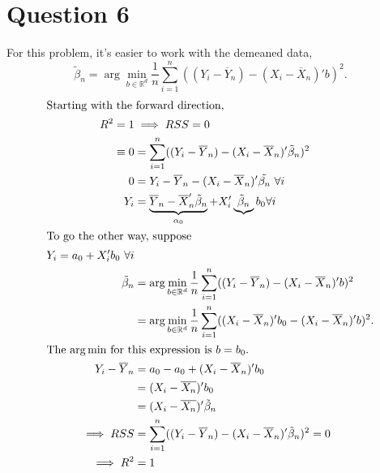 \documentclass[11pt]{article}
\newcommand{\R}{\mathbb{R}}
\begin{document}
\newpage
\section{Question 6}
\label{sec:org30a0a10}
For this problem, it's easier to work with the demeaned data, 
\[
  \tilde{\beta}_n = \arg \min_{b \in \R^d} \frac{1}{n} \sum^n_{i = 1} ((Y_i - \overline{Y}_n) - (X_i - \overline{X}_n)' b)^2.
  \]
\begin{align*}
\intertext{Starting with the forward direction,}
R^2 = 1 & \implies RSS = 0\\
\equiv 0 &= \sum^n_{i = 1} ((Y_i - \overline{Y}_n) - (X_i - \overline{X}_n)' \tilde{\beta}_n)^2\\
0 &= Y_i - \overline{Y}_n - (X_i - \overline{X}_n)' \tilde{\beta_n}\ \forall i\\
Y_i &= \underbrace{\overline{Y}_n - \overline{X}_n ' \tilde{\beta}_n}_{\alpha_0} + X_i' \underbrace{\tilde{\beta}_n}{b_0} \forall i\\
\intertext{To go the other way, suppose}
Y_i = a_0 + X_i' b_0 \ \forall i\\
\tilde{\beta}_n &= \arg \min_{b \in \R^d} \frac{1}{n} \sum^n_{i = 1} ((Y_i - \overline{Y}_n) - (X_i - \overline{X}_n)' b)^2\\
&= \arg \min_{b \in \R^d} \frac{1}{n} \sum^n_{i = 1} ((X_i - \overline{X}_n)' b_0 - (X_i - \overline{X}_n)' b)^2.\\
\intertext{The $\arg \min$ for this expression is $b = b_0$.}
Y_i - \overline{Y}_n &= a_0 - a_0 + (X_i - \overline{X}_n)' b_0\\
&= (X_i - \overline{X_n})' b_0\\
&= (X_i - \overline{X_n})' \tilde{\beta}_n\\
\implies RSS &= \sum^n_{i = 1} ((Y_i - \overline{Y}_n) - (X_i - \overline{X}_n)' \tilde{\beta}_n)^2 = 0\\
\implies R^2 &= 1
\end{align*}
\newpage
\end{document}
